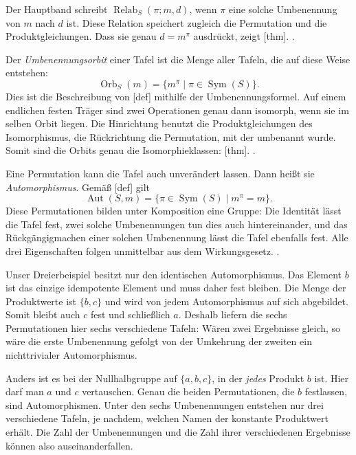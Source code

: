 Der Hauptband schreibt
\(\operatorname{Relab}_S(\pi;m,d)\), wenn \(\pi\) eine solche
Umbenennung von \(m\) nach \(d\) ist. Diese Relation speichert
zugleich die Permutation und die Produktgleichungen. Dass sie genau
\(d=m^\pi\) ausdrückt, zeigt
[thm].
.

Der \emph{Umbenennungsorbit} einer Tafel ist die Menge aller Tafeln,
die auf diese Weise entstehen:
\[
  \operatorname{Orb}_S(m)
   =\{m^\pi\mid\pi\in\operatorname{Sym}(S)\}.
\]
Dies ist die Beschreibung von
[def] mithilfe der
Umbenennungsformel. Auf einem endlichen festen Träger sind zwei
Operationen genau dann isomorph, wenn sie im selben Orbit liegen.
Die Hinrichtung benutzt die Produktgleichungen des Isomorphismus,
die Rückrichtung die Permutation, mit der umbenannt wurde. Somit
sind die Orbits genau die Isomorphieklassen:
[thm].
.

Eine Permutation kann die Tafel auch unverändert lassen. Dann heißt
sie \emph{Automorphismus}. Gemäß
[def] gilt
\[
  \operatorname{Aut}(S,m)
   =\{\pi\in\operatorname{Sym}(S)\mid m^\pi=m\}.
\]
Diese Permutationen bilden unter Komposition eine Gruppe: Die
Identität lässt die Tafel fest, zwei solche Umbenennungen tun dies
auch hintereinander, und das Rückgängigmachen einer solchen
Umbenennung lässt die Tafel ebenfalls fest. Alle drei Eigenschaften
folgen unmittelbar aus dem Wirkungsgesetz.
.

Unser Dreierbeispiel besitzt nur den identischen Automorphismus.
Das Element \(b\) ist das einzige idempotente Element und muss daher
fest bleiben. Die Menge der Produktwerte ist \(\{b,c\}\) und wird
von jedem Automorphismus auf sich abgebildet. Somit bleibt auch
\(c\) fest und schließlich \(a\). Deshalb liefern die sechs
Permutationen hier sechs verschiedene Tafeln: Wären zwei Ergebnisse
gleich, so wäre die erste Umbenennung gefolgt von der Umkehrung der
zweiten ein nichttrivialer Automorphismus.

Anders ist es bei der Nullhalbgruppe auf \(\{a,b,c\}\), in der
\emph{jedes} Produkt \(b\) ist. Hier darf man \(a\) und \(c\)
vertauschen. Genau die beiden Permutationen, die \(b\) festlassen,
sind Automorphismen. Unter den sechs Umbenennungen entstehen nur
drei verschiedene Tafeln, je nachdem, welchen Namen der konstante
Produktwert erhält. Die Zahl der Umbenennungen und die Zahl ihrer
verschiedenen Ergebnisse können also auseinanderfallen.

